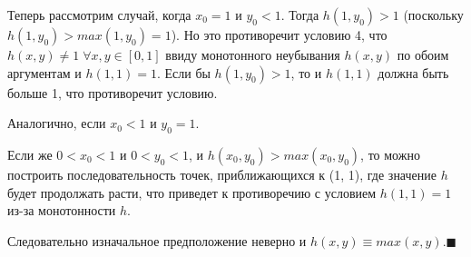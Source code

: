 Теперь рассмотрим случай, когда $x_0 = 1$ и $y_0 < 1$.  Тогда $h(1, y_0) > 1$  (поскольку $h(1,y_0) > max(1, y_0) = 1$). Но это противоречит условию 4, что $h(x,y) \neq 1 \; \forall x, y \in [0, 1]$ ввиду монотонного неубывания $h(x,y)$ по обоим аргументам и $h(1,1) = 1$.  Если бы $h(1, y_0) > 1$, то и $h(1,1)$ должна быть больше 1, что противоречит условию.

Аналогично, если  $x_0 < 1$ и $y_0 = 1$.

Если же $0 < x_0 < 1$ и $0 < y_0 < 1$, и  $h(x_0, y_0) > max(x_0, y_0)$, то можно построить последовательность точек, приближающихся к (1, 1),  где значение $h$ будет продолжать расти, что приведет к противоречию с условием $h(1, 1) = 1$ из-за монотонности $h$.

Следовательно изначальное предположение неверно и $h(x,y)\equiv max(x,y).\blacksquare$

